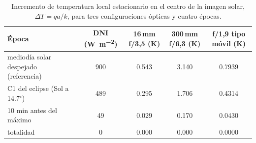 \begin{table}[htbp]\centering\small
\caption{Incremento de temperatura local estacionario en el centro de la imagen solar, $\Delta T = qa/k$, para tres configuraciones ópticas y cuatro épocas.}
\label{tab:thermal}
\begin{tabular}{lS[table-format=3.0]S[table-format=1.3]S[table-format=1.3]S[table-format=1.4]}
\toprule
Época & {DNI (\si{\watt\per\square\meter})} & {16\,mm f/3,5 (K)} & {300\,mm f/6,3 (K)} & {f/1,9 tipo móvil (K)} \\
\midrule
mediodía solar despejado (referencia) & 900 & 0.543 & 3.140 & 0.7939 \\
C1 del eclipse (Sol a 14.7$^\circ$) & 489 & 0.295 & 1.706 & 0.4314 \\
10 min antes del máximo & 49 & 0.029 & 0.170 & 0.0430 \\
totalidad & 0 & 0.000 & 0.000 & 0.0000 \\
\bottomrule
\end{tabular}
\end{table}
